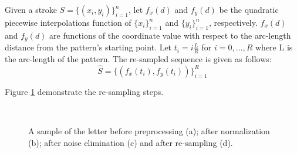 \iftoggle{edit-mode}{\hspace{0pt}\marginpar{Approach}}{}
Given a stroke $S=\{(x_i,y_i)\}_{i=1}^{n}$, let $f_{x}(d)$ and $f_{y}(d)$ be the quadratic piecewise interpolations function of $\{x_i\}_{i=1}^{n}$ and $\{y_i\}_{i=1}^{n}$, respectively. 
$f_{x}(d)$ and $f_{y}(d)$ are functions of the coordinate value with respect to the arc-length distance from the pattern's starting point. 
Let $t_i=i\frac{L}{R}$ for $i=0,...,R$ where L is the arc-length of the pattern.
The re-sampled sequence is given as follows:
\begin{equation}
\widehat{S}=\{(f_x(t_i),f_y(t_i))\}_{i=1}^{R}
\end{equation}

Figure \ref{fig:before_after_preprocessing} demonstrate the re-sampling steps.

\begin{figure}
	\centering
          \\
    \caption{A sample of the letter  before preprocessing (a); after normalization (b); after noise elimination (c) and after re-sampling (d).}
   \label{fig:before_after_preprocessing}
\end{figure}


